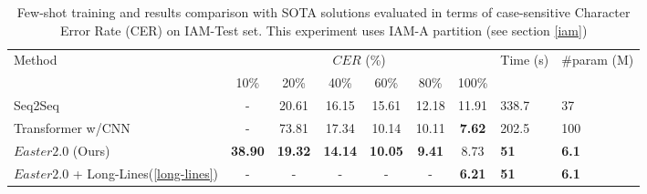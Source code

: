 \documentclass{article}
\begin{document}
\begin{table}
 \caption{Few-shot training and results comparison with SOTA solutions evaluated in terms of case-sensitive Character Error Rate (CER) on IAM-Test set. This experiment uses IAM-A partition (see section \ref{iam})}
  \centering
  \begin{tabular}{l*{6}{c}ll}
    \toprule
    Method & \multicolumn{6}{c}{$CER$ (\%)}& Time (s) & \#param (M)\\
    \cmidrule(lr){2-7}
    & \multicolumn{1}{c}{10\%} & \multicolumn{1}{c}{20\%} & 
      \multicolumn{1}{c}{40\%} & \multicolumn{1}{c}{60\%} &
      \multicolumn{1}{c}{80\%} & \multicolumn{1}{c}{100\%} & & \\
      
    \midrule
    Seq2Seq\cite{kang2020pay} & - & 20.61 & 16.15 & 15.61 & 12.18 & 11.91 & 338.7 & 37\\
    Transformer w/CNN\cite{kang2020pay} & - & 73.81 & 17.34 & 10.14 & 10.11 & \textbf{7.62} & 202.5 & 100\\
    \midrule
    $Easter2.0$ (Ours) & \textbf{38.90} & \textbf{19.32} & \textbf{14.14} & \textbf{10.05} & \textbf{9.41} & 8.73 & \textbf{51} & \textbf{6.1}\\
    $Easter2.0$ + Long-Lines(\ref{long-lines}) & - & - & - & - & - & \textbf{6.21} & \textbf{51} & \textbf{6.1}\\
    \bottomrule
  \end{tabular}
  \label{tab:fs_table}
\end{table}
\end{document}
